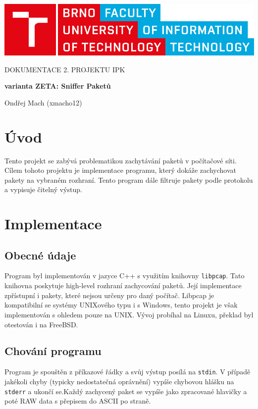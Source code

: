 \documentclass[12pt,a4paper]{article}
\begin{document}
\begin{titlepage}
	\begin{center}
		\includegraphics[width=0.5\linewidth]{img/logo.pdf}
		\vspace{3cm}
			
		\LARGE\uppercase{Dokumentace 2. projektu IPK}
		\vspace{1cm}
			
		\LARGE\textbf{varianta ZETA: Sniffer Paketů}
			
		\vspace*{\fill}
		\large{Ondřej Mach (xmacho12)}
	\end{center}
\end{titlepage}
	
	
\setcounter{page}{1}
\tableofcontents
\clearpage
	
	

\section{Úvod}
Tento projekt se zabývá problematikou zachytávání paketů v počítačové síti.
Cílem tohoto projektu je implementace programu, který dokáže zachychovat pakety na vybraném rozhraní.
Tento program dále filtruje pakety podle protokolu a vypisuje čitelný výstup.
\newpage

\section{Implementace}
\subsection{Obecné údaje}
Program byl implementován v jazyce C++ s využitím knihovny \texttt{libpcap}.
Tato knihovna poskytuje high-level rozhraní zachycování paketů. Její implementace zpřístupní i pakety, které nejsou určeny pro daný počítač.
Libpcap je kompatibilní se systémy UNIXového typu i s Windows, tento projekt je však implementován s ohledem pouze na UNIX.
Vývoj probíhal na Linuxu, překlad byl otestován i na FreeBSD.

\subsection{Chování programu}
Program je spouštěn z příkazové řádky a svůj výstup posílá na \texttt{stdin}.
V případě jakékoli chyby (typicky nedostatečná oprávnění) vypíše chybovou hlášku na \texttt{stderr} a ukončí se.Každý zachycený paket se vypíše jako zpracované hlavičky a poté RAW data s přepisem do ASCII po straně.
\end{document}
